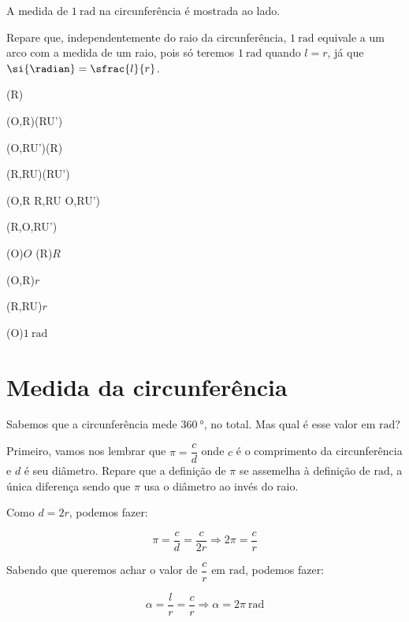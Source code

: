 \begin{multi}

	\noindent A medida de $\SI{1}{\radian}$ na circunferência é mostrada ao lado.

	\noindent Repare que, independentemente do raio da circunferência, $1~\si{\radian}$ equivale a um arco com a medida de um raio, pois só teremos $\SI{1}{\radian}$ quando $l=r$, já que $\si{\radian}=\sfrac{l}{r}$.

	\nextcol

	\begin{tikzscale}[0.8]

		\tkzDefPointBy[rotation in rad= center O angle 1.05](R) 

		\tkzDrawArc[color=red, thick, dashed](O,R)(RU')

		\tkzDrawArc[color=black](O,RU')(R)

		\tkzDrawArc[dashed, color=black](R,RU)(RU')

		\tkzDrawSegments(O,R R,RU O,RU')

		\tkzMarkAngle[size=1](R,O,RU')

		\tkzLabelPoint[xshift=-15pt, yshift=3pt](O){$O$}
		\tkzLabelPoint[xshift=0pt, yshift=3pt](R){$R$}

		\tkzLabelSegment[below](O,R){$r$}

		\tkzLabelSegment[right](R,RU){$r$}

		\tkzLabelPoint[xshift=19pt, yshift=21pt](O){$\SI{1}{\radian}$}

	\end{tikzscale}
\end{multi}

\section{Medida da circunferência}

Sabemos que a circunferência mede $\SI{360}{\degree}$, no total. Mas qual é esse valor em $\si{\radian}$?

Primeiro, vamos nos lembrar que $\pi=\dfrac{c}{d}$ onde $c$ é o comprimento da circunferência e $d$ é seu diâmetro. Repare que a definição de $\pi$ se assemelha à definição de $\si{\radian}$, a única diferença sendo que $\pi$ usa o diâmetro ao invés do raio.

Como $d=2r$, podemos fazer:

$$
	\pi=\frac{c}{d}=\frac{c}{2r}\Rightarrow 2\pi=\frac{c}{r}
$$

Sabendo que queremos achar o valor de $\dfrac{c}{r}$ em $\si{\radian}$, podemos fazer:

$$
	\alpha=\frac{l}{r}=\frac{c}{r}\Rightarrow\alpha=2\pi~\si{\radian}
$$

